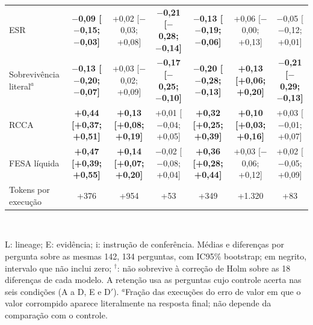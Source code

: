 \begin{table}[t]
{\begin{tabular}{|l|ccc|ccc|}
ESR & \textbf{$-$0,09 [$-$0,15; $-$0,03]} & +0,02 [$-$0,03; +0,08] & \textbf{$-$0,21 [$-$0,28; $-$0,14]} & \textbf{$-$0,13 [$-$0,19; $-$0,06]} & +0,06 [$-$0,00; +0,13] & $-$0,05 [$-$0,12; +0,01] \\
Sobrevivência literal$^{a}$ & \textbf{$-$0,13 [$-$0,20; $-$0,07]} & +0,03 [$-$0,02; +0,09] & \textbf{$-$0,17 [$-$0,25; $-$0,10]} & \textbf{$-$0,20 [$-$0,28; $-$0,13]} & \textbf{+0,13 [+0,06; +0,20]} & \textbf{$-$0,21 [$-$0,29; $-$0,13]} \\
RCCA & \textbf{+0,44 [+0,37; +0,51]} & \textbf{+0,13 [+0,08; +0,19]} & +0,01 [$-$0,04; +0,05] & \textbf{+0,32 [+0,25; +0,39]} & \textbf{+0,10 [+0,03; +0,16]} & +0,03 [$-$0,01; +0,07] \\
FESA líquida & \textbf{+0,47 [+0,39; +0,55]} & \textbf{+0,14 [+0,07; +0,20]} & $-$0,02 [$-$0,08; +0,04] & \textbf{+0,36 [+0,28; +0,44]} & +0,03 [$-$0,06; +0,12] & +0,02 [$-$0,05; +0,09] \\
Tokens por execução & +376 & +954 & +53 & +349 & +1.320 & +83 \\
\hline
\end{tabular}}
\\[2pt]{\scriptsize\raggedright L: lineage; E: evidência; i: instrução de conferência. Médias e diferenças por pergunta sobre as mesmas 142, 134 perguntas, com IC95\% bootstrap; em negrito, intervalo que não inclui zero; $^{\dagger}$: não sobrevive à correção de Holm sobre as 18 diferenças de cada modelo. A retenção usa as perguntas cujo controle acerta nas seis condições (A a D, E e D$'$). $^{a}$Fração das execuções do erro de valor em que o valor corrompido aparece literalmente na resposta final; não depende da comparação com o controle.\par}
\end{table}
